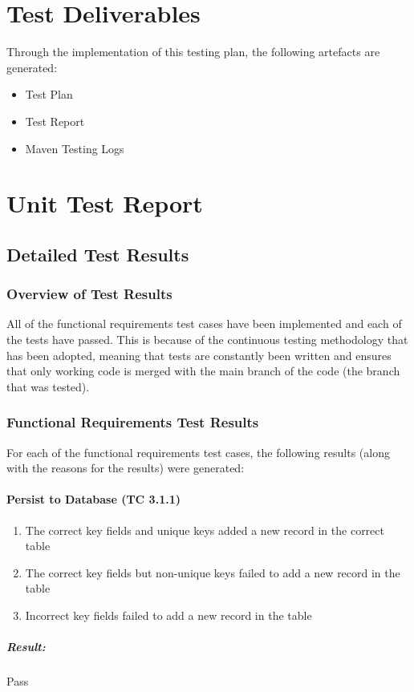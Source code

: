 \documentclass{article}
\begin{document}
\section{Test Deliverables}
	Through the implementation of this testing plan, the following artefacts are generated:
	\begin{itemize}
		\item Test Plan
		\item Test Report
		\item Maven Testing Logs
	\end{itemize}
	
\newpage
	
\section{Unit Test Report}
	\subsection{Detailed Test Results}
		\subsubsection{Overview of Test Results}
			All of the functional requirements test cases have been implemented and each of the tests have passed. This is because of the continuous testing methodology that has been adopted, meaning that tests are constantly been written and ensures that only working code is merged with the main branch of the code (the branch that was tested).
		
		\subsubsection{Functional Requirements Test Results}
			For each of the functional requirements test cases, the following results (along with the reasons for the results) were generated:
			
			\paragraph{Persist to Database (TC 3.1.1)}
				\begin{enumerate}
					\item The correct key fields and unique keys added a new record in the correct table
					\item The correct key fields but non-unique keys failed to add a new record in the table
					\item Incorrect key fields failed to add a new record in the table
				\end{enumerate}
				\subparagraph{Result: } Pass
			
\end{document}
